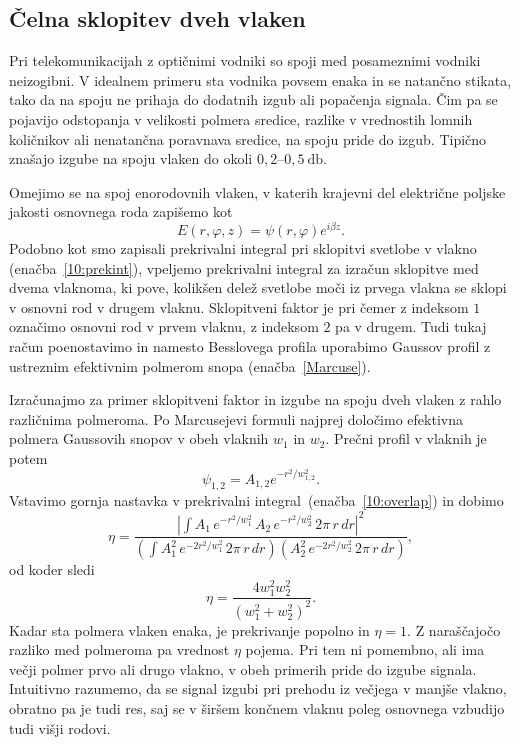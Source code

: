 \subsection*{Čelna sklopitev dveh vlaken}
Pri telekomunikacijah z optičnimi vodniki so spoji med posameznimi vodniki neizogibni.
V idealnem primeru sta vodnika povsem enaka in se natančno stikata, tako da na spoju
ne prihaja do dodatnih izgub ali popačenja signala. Čim pa se pojavijo odstopanja 
v velikosti polmera sredice, razlike v vrednostih lomnih količnikov ali nenatančna poravnava 
sredice, na spoju pride do izgub. Tipično znašajo izgube na spoju vlaken do okoli 
$0,2$--$0,5~\si{\decibel}$.

Omejimo se na spoj enorodovnih vlaken, v katerih krajevni del 
električne poljske jakosti osnovnega roda zapišemo kot
\begin{equation}
E(r, \varphi, z)=\psi(r, \varphi) e^{i\beta z}.
\end{equation} 
Podobno kot smo zapisali prekrivalni integral pri sklopitvi svetlobe v vlakno (enačba~\ref{10:prekint}),
vpeljemo prekrivalni integral za izračun sklopitve med dvema vlaknoma,
ki pove, kolikšen delež svetlobe moči iz prvega vlakna 
se sklopi v osnovni rod v drugem vlaknu. Sklopitveni faktor je
pri čemer z indeksom $1$ označimo osnovni rod v prvem vlaknu, z indeksom $2$ pa 
v drugem. Tudi tukaj račun poenostavimo in namesto Besslovega profila uporabimo 
Gaussov profil z ustreznim efektivnim polmerom snopa (enačba~\ref{Marcuse}).

Izračunajmo za primer sklopitveni faktor in izgube na spoju dveh vlaken z rahlo 
različnima polmeroma. Po Marcusejevi formuli najprej določimo efektivna polmera Gaussovih snopov
v obeh vlaknih $w_1$ in $w_2$. Prečni profil v vlaknih je potem
\begin{equation}
\psi_{1,2} = A_{1,2} e^{-r^2/w_{1,2}^2}.
\end{equation}
Vstavimo gornja nastavka v prekrivalni integral~(enačba~\ref{10:overlap}) in dobimo
\begin{equation}
\eta = \frac{|\int A_1 \, e^{-r^2/w_1^2}\, A_2\, e^{-r^2/w_2^2}\, 2 \pi\, r\, dr|^2}
{\left(\int A_1^2 \,e^{-2r^2/w_1^2} \, 2 \pi \, r\, dr \right) \left( A_2^2\, 
e^{-2r^2/w_2^2}\, 2 \pi \, r\, dr \right)},
\label{10:prekintw}
\end{equation}
od koder sledi
\begin{equation}
\eta = \frac{4 w_1^2 w_2^2}{(w_1^2+w_2^2)^2}.
\label{10:w1w2}
\end{equation}
Kadar sta polmera vlaken enaka, je prekrivanje popolno in $\eta = 1$. Z naraščajočo razliko
med polmeroma pa vrednost $\eta$ pojema. Pri tem
ni pomembno, ali ima večji polmer prvo ali drugo vlakno, v obeh primerih pride do izgube 
signala. Intuitivno razumemo, da se signal izgubi pri prehodu iz večjega v manjše vlakno, 
obratno pa je tudi res, saj se v širšem končnem vlaknu poleg osnovnega vzbudijo
tudi višji rodovi. 

